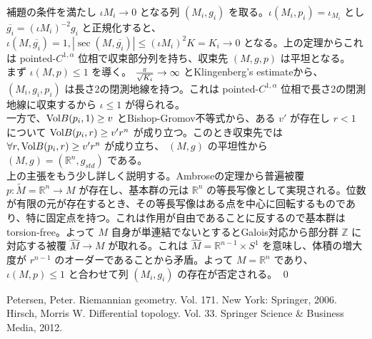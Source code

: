 \documentclass[dvipdfmx,a4paper]{jsarticle}
\theoremstyle{definition}
\renewcommand{\tilde}{\widetilde}
\renewcommand{\bar}{\overline}
\renewcommand{\hat}{\widehat}
\newcommand{\Vol}{{\rm Vol}}
\newcommand{\Z}{\mathbb{Z}}
\newcommand{\R}{\mathbb{R}}
\begin{document}
\prf 補題の条件を満たし $\iota {M_i} \to 0$ となる列 $(M_i,g_i)$ を取る。$\iota (M_i,p_i)=\iota_{M_i}$ とし $\bar{g_i}=(\iota M_i)^{-2}g_i$ と正規化すると、$\iota(M,\bar{g_i})=1,|\sec(M,\bar{g_i})| \leq (\iota M_i)^{2}K=K_i \to 0$ となる。上の定理からこれは pointed-$C^{1,\alpha}$ 位相で収束部分列を持ち、収束先 $(M,g,p)$ は平坦となる。\\
まず $\iota(M,p) \leq 1$ を導く。 ${\pi \over \sqrt{K_i}} \to \infty$ とKlingenberg's estimateから、 $(M_i,g_i,p_i)$ は長さ2の閉測地線を持つ。これは pointed-$C^{1,\alpha}$ 位相で長さ2の閉測地線に収束するから $\iota \leq 1$ が得られる。 \\
一方で、$\Vol B(p_i,1) \geq v$ とBishop-Gromov不等式から、ある $v'$ が存在し $r<1$ について $\Vol B(p_i,r) \geq v' r^n$ が成り立つ。このとき収束先では $\forall r,\Vol B(p_i,r) \geq v' r^n$ が成り立ち、 $(M,g)$ の平坦性から $(M,g)=(\R^n,g_{std})$ である。 \\
上の主張をもう少し詳しく説明する。Ambroseの定理から普遍被覆 $p:\tilde{M}=\R^n \to M$ が存在し、基本群の元は $\R^n$ の等長写像として実現される。位数が有限の元が存在するとき、その等長写像はある点を中心に回転するものであり、特に固定点を持つ。これは作用が自由であることに反するので基本群はtorsion-free。よって $M$ 自身が単連結でないとするとGalois対応から部分群 $\Z$ に対応する被覆 $\hat{M} \to M$ が取れる。これは $\hat{M}=\R^{n-1} \times S^1$ を意味し、体積の増大度が $r^{n-1}$ のオーダーであることから矛盾。よって $M=\R^n$ であり、 $\iota(M,p) \leq 1$ と合わせて列 $(M_i,g_i)$ の存在が否定される。 \qed



\begin{thebibliography}{9}
     Petersen, Peter. Riemannian geometry. Vol. 171. New York: Springer, 2006.
    Hirsch, Morris W. Differential topology. Vol. 33. Springer Science \& Business Media, 2012.
\end{thebibliography}
\end{document}
